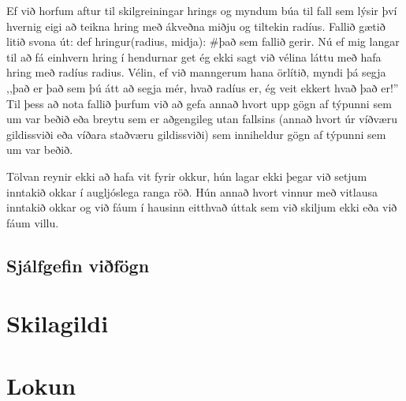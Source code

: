 Ef við horfum aftur til skilgreiningar hrings og myndum búa til fall sem lýsir því hvernig eigi að teikna hring með ákveðna miðju og tiltekin radíus.
Fallið gætið litið svona út: \newline def hringur(radius, midja): \newline #það sem fallið gerir. \newline
Nú ef mig langar til að fá einhvern hring í hendurnar get ég ekki sagt við vélina láttu með hafa hring með radíus radius.
Vélin, ef við manngerum hana örlítið, myndi þá segja ,,það er það sem þú átt að segja mér, hvað radíus er, ég veit ekkert hvað það er!''
Til þess að nota fallið þurfum við að gefa annað hvort upp gögn af týpunni sem um var beðið eða breytu sem er aðgengileg utan fallsins (annað hvort úr víðværu gildissviði eða víðara staðværu gildissviði) sem inniheldur gögn af týpunni sem um var beðið.

Tölvan reynir ekki að hafa vit fyrir okkur, hún lagar ekki þegar við setjum inntakið okkar í augljóslega ranga röð.
Hún annað hvort vinnur með vitlausa inntakið okkar og við fáum í hausinn eitthvað úttak sem við skiljum ekki eða við fáum villu.

\subsection{Sjálfgefin viðfögn}

\section{Skilagildi}\label{uk:skilagildi}

\section{Lokun}